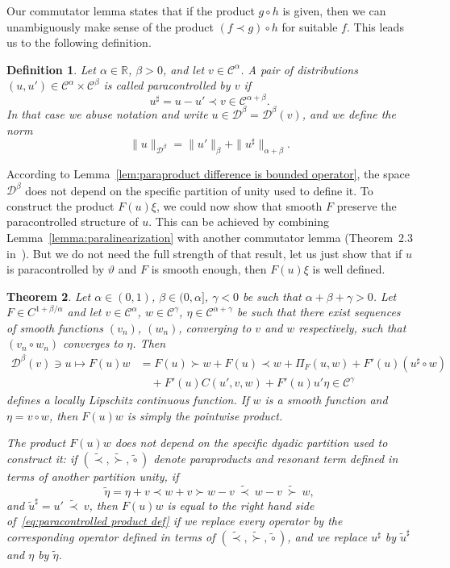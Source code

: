 \documentclass[11pt,a4paper]{article}
\newtheorem{theorem}{Theorem}[section]
\newtheorem{definition}[theorem]{Definition}
\theoremstyle{remark}
\newcommand{\R}{\mathbb{R}}
\newcommand{\CC}{\ensuremath{\mathscr{C}}}
\newcommand{\CD}{\ensuremath{\mathscr{D}}}
\begin{document}
Our commutator lemma states that if the product $g \circ h$ is given, then we can unambiguously make sense of the product $(f\prec g) \circ h$ for suitable $f$. This leads us to the following definition.

\begin{definition}\label{def:paracontrolled}
   Let $\alpha \in \R$, $\beta>0$, and let $v \in \CC^\alpha$. A pair of distributions $(u,u') \in \CC^\alpha \times \CC^{\beta}$ is called \emph{paracontrolled} by $v$ if
   \[
      u^\sharp = u - u'\prec v \in \CC^{\alpha+\beta}.
   \]
   In that case we abuse notation and write $u \in \CD^\beta = \CD^\beta(v)$, and we define the norm
   \[
     \| u \|_{\CD^\beta} = \|u'\|_\beta + \|u^\sharp\|_{\alpha+\beta}. 
   \]
\end{definition}

According to Lemma~\ref{lem:paraproduct difference is bounded operator}, the space $\CD^\beta$ does not depend on the specific partition of unity used to define it. To construct the product $F(u)\xi$, we could now show that smooth $F$ preserve the paracontrolled structure of $u$. This can be achieved by combining Lemma~\ref{lemma:paralinearization} with another commutator lemma (Theorem~2.3 in~\cite{Bony1981}). But we do not need the full strength of that result, let us just show that if $u$ is paracontrolled by $\vartheta$ and $F$ is smooth enough, then $F(u) \xi$ is well defined.

\begin{theorem}\label{theorem:product operator}
  Let $\alpha \in (0,1)$, $\beta \in (0,\alpha]$, $\gamma < 0$ be such that $\alpha + \beta + \gamma >0$. Let $F \in C^{1+\beta/\alpha}$ and let $v \in \CC^\alpha$, $w \in \CC^\gamma$, $\eta \in \CC^{\alpha+\gamma}$ be such that there exist sequences of smooth functions $(v_n)$, $(w_n)$, converging to $v$ and $w$ respectively, such that $(v_n \circ w_n)$ converges to $\eta$. Then
  \begin{align}\label{eq:paracontrolled product def}
     \CD^\beta(v) \ni u \mapsto F(u) w  & = F(u)\succ w + F(u) \prec w + \Pi_F(u,w) + F'(u) (u^\sharp \circ w) \\ \nonumber
     &\quad + F'(u) C(u', v, w) + F'(u) u' \eta \in \CC^\gamma
  \end{align}
  defines a locally Lipschitz continuous function. If $w$ is a smooth function and $\eta = v \circ w$, then $F(u) w$ is simply the pointwise product.
  
  The product $F(u)w$ does not depend on the specific dyadic partition used to construct it: if $(\widetilde{\prec}, \widetilde{\succ}, \widetilde{\circ})$ denote paraproducts and resonant term defined in terms of another partition unity, if
  \[
     \tilde \eta = \eta + v \prec w + v \succ w - v \ \widetilde \prec \ w - v \ \widetilde \succ \ w,
  \]
  and $\tilde{u}^\sharp = u' \ \widetilde \prec \ v$, then $F(u) w$ is equal to the right hand side of~\eqref{eq:paracontrolled product def} if we replace every operator by the corresponding operator defined in terms of $(\widetilde{\prec}, \widetilde{\succ}, \widetilde{\circ})$, and we replace $u^\sharp$ by $\tilde{u}^\sharp$ and $\eta$ by $\tilde \eta$.
\end{theorem}
\end{document}
